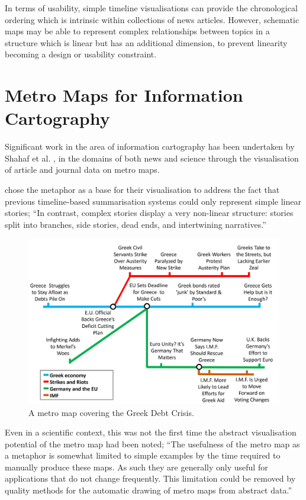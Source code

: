 In terms of usability, simple timeline visualisations can provide the chronological ordering which is intrinsic within collections of news articles. However, schematic maps may be able to represent complex relationships between topics in a structure which is linear but has an additional dimension, to prevent linearity becoming a design or usability constraint.

\section{Metro Maps for Information Cartography}
Significant work in the area of information cartography has been undertaken by Shahaf et al. \citep{ConnectingTheDots, GeneratingInformationMaps, MetroMapsOfScience, InformationCartographyPre}, in the domains of both news and science through the visualisation of article and journal data on metro maps.

\cite{GeneratingInformationMaps} chose the metaphor as a base for their visualisation to address the fact that previous timeline-based summarisation systems could only represent simple linear stories; ``In contrast, complex stories display a very non-linear structure: stories split into branches, side stories, dead ends, and intertwining narratives.'' \citep[p.1]{InformationCartographyPre}

\begin{figure}[htbp!]
	\centering
	\includegraphics[width=.8\textwidth]{img/lit-survey/greece-metromap.jpg}
	\caption{A metro map \citep{GeneratingInformationMaps} covering the Greek Debt Crisis.}
	\label{fig:greecemetro}
\end{figure}

Even in a scientific context, this was not the first time the abstract visualisation potential of the metro map had been noted; ``The usefulness of the metro map as a metaphor is somewhat limited to simple examples by the time required to manually produce these maps. As such they are generally only useful for applications that do not change frequently. This limitation could be removed by quality methods for the automatic drawing of metro maps from abstract data.'' \citep[p.54]{AutomaticMetroMapLayoutThesis}

